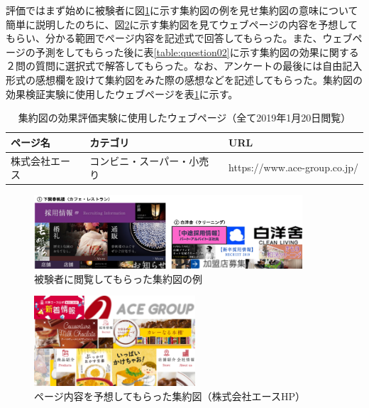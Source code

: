 \par 評価ではまず始めに被験者に図\ref{fig_experience03-2}に示す集約図の例を見せ集約図の意味について簡単に説明したのちに、図\ref{fig_experience03-1}に示す集約図を見てウェブページの内容を予想してもらい、分かる範囲でページ内容を記述式で回答してもらった。また、ウェブページの予測をしてもらった後に表\ref{table:question02}に示す集約図の効果に関する２問の質問に選択式で解答してもらった。なお、アンケートの最後には自由記入形式の感想欄を設けて集約図をみた際の感想などを記述してもらった。集約図の効果検証実験に使用したウェブページを表\ref{table:webpage-list3}に示す。

\begin{table}[h]
    \caption{集約図の効果評価実験に使用したウェブページ（全て2019年1月20日閲覧）}
    \label{table:webpage-list3}
    \centering
    \begingroup
    \renewcommand{\arraystretch}{1.2} %
    \small
      \begin{tabular}{lll}
      \hline
      ページ名 & カテゴリ & URL \\
      \hline \hline
      株式会社エース & コンビニ・スーパー・小売り & https://www.ace-group.co.jp/ \\
      \hline
    \end{tabular}
    \endgroup
\end{table}

\begin{figure}[H]
    \centering
    \includegraphics[width=10cm]{figures/experience03-2.png}
    \caption{被験者に閲覧してもらった集約図の例}
    \label{fig_experience03-2}
\end{figure}

\begin{figure}[H]
    \centering
    \includegraphics[width=6cm]{figures/experience03-1.png}
    \caption{ページ内容を予想してもらった集約図（株式会社エースHP）}
    \label{fig_experience03-1}
\end{figure}

